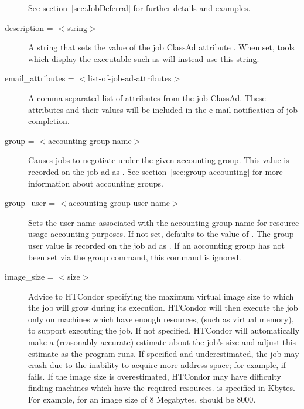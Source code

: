 \begin{description}
See section~\ref{sec:JobDeferral} for further details and examples.


\label{condor-submit-description}
\item[description = $<$string$>$]
A string that sets the value of the job ClassAd attribute
.
When set, tools which display the executable such as 
will instead use this string.


\label{condor-submit-email-attributes}
\item[email\_attributes = $<$list-of-job-ad-attributes$>$] 
A comma-separated list of attributes from the job ClassAd. These
attributes and their values will be included in the e-mail notification
of job completion.


\label{condor-submit-group}
\item[group = $<$accounting-group-name$>$] 
Causes jobs to negotiate under the given accounting group.  This value
is recorded on the job ad as .
See section~\ref{sec:group-accounting} for more information about 
accounting groups.


\label{condor-submit-group-user}
\item[group\_user = $<$accounting-group-user-name$>$] 
Sets the user name associated with the accounting group name for 
resource usage accounting purposes.  If not set, 
defaults to the value of .  The group user value is
recorded on the job ad as .
If an accounting group has not been set via the group command, 
this command is ignored.


\label{condor-submit-image-size}
\item[image\_size = $<$size$>$] Advice to HTCondor specifying the maximum
virtual image size to which the job will grow during its execution.
HTCondor will then execute the job only on machines which have enough resources,
(such as virtual memory), to support executing the job.
If not specified, HTCondor will automatically make a (reasonably accurate)
estimate about the job's size and adjust this estimate as the program runs.
If specified and underestimated, the job may crash due to
the inability to acquire more address space; 
for example, if  fails. 
If the image size is overestimated,
HTCondor may have difficulty finding machines which have the required resources.
 is specified in Kbytes. 
For example, for an image size of 8 Megabytes,  should be 8000.


\end{description}
